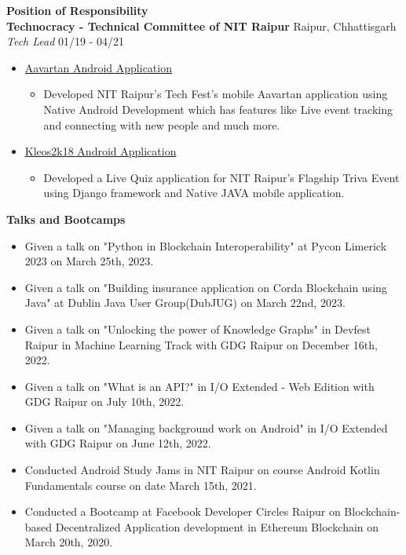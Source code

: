 \documentclass{article}
\begin{document}
\vspace{10pt}
\noindent \large \textbf{\textcolor{NavyBlue}{Position of Responsibility}} \vspace{5pt} \\
\noindent \normalsize \textbf{Technocracy - Technical Committee of NIT Raipur} \hfill Raipur, Chhattisgarh \\
\noindent \normalsize \textit{Tech Lead} \hfill 01/19 - 04/21
\begin{itemize}[noitemsep, nolistsep,leftmargin=*]
    \item {\href{https://bit.ly/aavartan}{Aavartan Android Application}
        \begin{itemize}
            \item Developed NIT Raipur's Tech Fest's mobile Aavartan application using Native Android Development which has features like Live event tracking and connecting with new people and much more.
        \end{itemize}
    }
    \item {\href{https://bit.ly/kleos2k18}{Kleos2k18 Android Application}
        \begin{itemize}
            \item Developed a Live Quiz application for NIT Raipur's Flagship Triva Event using Django framework and Native JAVA mobile application.
        \end{itemize}
    }
\end{itemize}
\noindent \large \textbf{\textcolor{NavyBlue}{Talks and Bootcamps}}
\begin{itemize}[noitemsep,nolistsep,leftmargin=*]
    \item { \normalsize Given a talk on "Python in Blockchain Interoperability" at Pycon Limerick 2023 on March 25th, 2023.}
    \item { \normalsize Given a talk on "Building insurance application on Corda Blockchain using Java" at Dublin Java User Group(DubJUG) on March 22nd, 2023.}
    \item { \normalsize Given a talk on "Unlocking the power of Knowledge Graphs" in Devfest Raipur in Machine Learning Track with GDG Raipur on December 16th, 2022.  }
    \item { \normalsize Given a talk on "What is an API?" in I/O Extended - Web Edition with GDG Raipur on July 10th, 2022.  }
    \item { \normalsize Given a talk on "Managing background work on Android" in I/O Extended with GDG Raipur on June 12th, 2022.  }
    \item { \normalsize Conducted Android Study Jams in NIT Raipur on course Android Kotlin Fundamentals course on date March 15th, 2021. }
    \item { \normalsize Conducted a Bootcamp at Facebook Developer Circles Raipur on Blockchain-based Decentralized Application development in Ethereum Blockchain on March 20th, 2020. }
\end{itemize}
\end{document}

